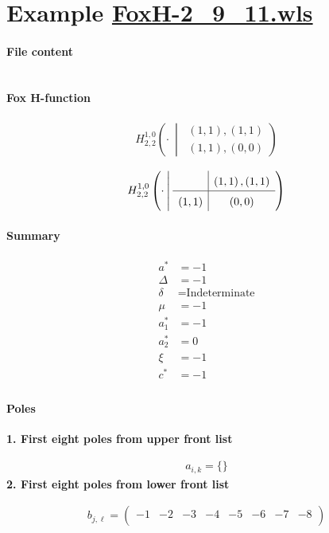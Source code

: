 \documentclass[11pt]{article}
\newcommand{\FoxH}[5]{H_{#2}^{#1}\left(#3\:\middle\vert\: \begin{array}{l}#4\\[0.4em] #5\end{array}\right)}
\begin{document}
\section{Example \url{FoxH-2_9_11.wls}}

\paragraph{File content}

\inputminted{text}{FoxH-2_9_11.wls}

\paragraph{Fox H-function}

\begin{align*}
  \FoxH
    {1,0}
    {2,2}
    {\cdot}
    {\left(1, 1\right), \left(1, 1\right)}
    {\left(1, 1\right), \left(0, 0\right)}
\end{align*}

\begin{align*}
  \FoxHext
    {1,0}
    {2,2}
    {\cdot}
    {}
    {\left(1, 1\right), \left(1, 1\right)}
    {\left(1, 1\right)}
    {\left(0, 0\right)}
\end{align*}

\paragraph{Summary}

\begin{align*}
  a^*    & = -1 \\
  \Delta & = -1 \\
  \delta & = \text{Indeterminate} \\
  \mu    & = -1 \\
  a_1^*  & = -1 \\
  a_2^*  & = 0 \\
  \xi    & = -1 \\
  c^*    & = -1 \\
\end{align*}

\paragraph{Poles}

\noindent\textbf{1. First eight poles from upper front list}

\begin{align*}
  a_{i,k} = 
  \{\}
\end{align*}
\noindent\textbf{2. First eight poles from lower front list}

\begin{align*}
  b_{j,\ell} = 
  \left(
\begin{array}{cccccccc}
 -1 & -2 & -3 & -4 & -5 & -6 & -7 & -8 \\
\end{array}
\right)
\end{align*}

\printbibliography[title={References}]
\end{document}
